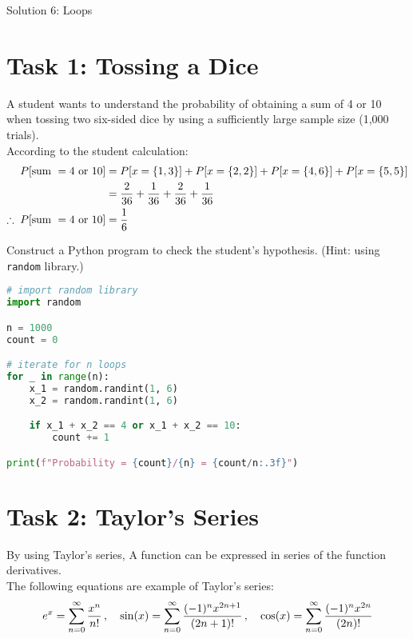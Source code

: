 \documentclass[11pt]{article}
\begin{document}
\begin{center}
    \Large{Solution 6: Loops}
\end{center}

\section*{Task 1: Tossing a Dice}
A student wants to understand the probability of obtaining a sum of 4 or 10 when tossing two six-sided dice by using a sufficiently large sample size (1,000 trials).\\

\noindent
According to the student calculation:
\[
\begin{aligned}
    P[\text{sum } = 4 \text{ or } 10] &= P[x = \{1, 3\}] + P[x = \{2, 2\}] + P[x = \{4, 6\}] + P[x = \{5, 5\}]\\
    &= \frac{2}{36} + \frac{1}{36} + \frac{2}{36} + \frac{1}{36}\\
    \therefore \hspace{0.1cm} P[\text{sum } = 4 \text{ or } 10] &= \frac{1}{6}
\end{aligned}
\]

\noindent
Construct a Python program to check the student's hypothesis. (Hint: using \texttt{random} library.)\\

\begin{lstlisting}[language=Python]
# import random library
import random

n = 1000
count = 0

# iterate for n loops
for _ in range(n):
    x_1 = random.randint(1, 6)
    x_2 = random.randint(1, 6)

    if x_1 + x_2 == 4 or x_1 + x_2 == 10:
        count += 1

print(f"Probability = {count}/{n} = {count/n:.3f}")
\end{lstlisting}


\clearpage
\section*{Task 2: Taylor's Series}

By using Taylor's series, A function can be expressed in series of the function derivatives.\\
\noindent
The following equations are example of Taylor's series:
\[
e^x = \sum_{n=0}^\infty \frac{x^n}{n!} \, , \quad \sin(x) = \sum_{n=0}^\infty \frac{(-1)^n x^{2n + 1}}{(2n + 1)!} \, , \quad \cos(x) = \sum_{n=0}^\infty \frac{(-1)^n x^{2n}}{(2n)!}\\
\]
\end{document}
